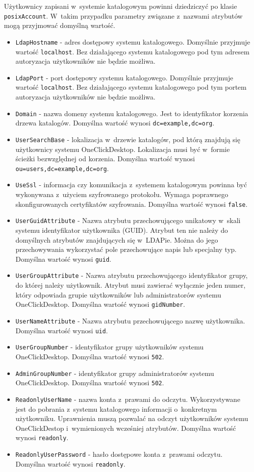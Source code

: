 \documentclass[../opis-rozwiazania.tex]{subfiles}
\begin{document}
Użytkownicy zapisani w~systemie katalogowym powinni dziedziczyć po klasie \texttt{posixAccount}. W~takim przypadku parametry związane z~nazwami atrybutów mogą przyjmować domyślną wartość.
\begin{itemize}
  \item \texttt{LdapHostname} - adres dostępowy systemu katalogowego. Domyślnie przyjmuje wartość \texttt{localhost}. Bez działającego systemu katalogowego pod tym adresem autoryzacja użytkowników nie będzie możliwa.
  \item \texttt{LdapPort} - port dostępowy systemu katalogowego. Domyślnie przyjmuje wartość \texttt{localhost}. Bez działającego systemu katalogowego pod tym portem autoryzacja użytkowników nie będzie możliwa.
  \item \texttt{Domain} - nazwa domeny systemu katalogowego. Jest to identyfikator korzenia drzewa katalogów. Domyślna wartość wynosi \texttt{dc=example,dc=org}.
  \item \texttt{UserSearchBase} - lokalizacja w~drzewie katalogów, pod którą znajdują się użytkownicy systemu OneClickDesktop. Lokalizacja musi być w~formie ścieżki bezwzględnej od korzenia. Domyślna wartość wynosi \texttt{ou=users,dc=example,dc=org}.
  \item \texttt{UseSsl} - informacja czy komunikacja z~systemem katalogowym powinna być wykonywana z~użyciem szyfrowanego protokołu. Wymaga poprawnego skonfigurowanych certyfikatów szyfrowania. Domyślna wartość wynosi \texttt{false}.
  \item \texttt{UserGuidAttribute} - Nazwa atrybutu przechowującego unikatowy w~skali systemu identyfikator użytkownika (GUID). Atrybut ten nie należy do domyślnych atrybutów znajdujących się w~LDAPie. Można do jego przechowywania wykorzystać pole przechowujące napis lub specjalny typ. Domyślna wartość wynosi \texttt{guid}.
  \item \texttt{UserGroupAttribute} - Nazwa atrybutu przechowującego identyfikator grupy, do której należy użytkownik. Atrybut musi zawierać wyłącznie jeden numer, który odpowiada grupie użytkowników lub administratorów systemu OneClickDesktop. Domyślna wartość wynosi \texttt{gidNumber}.
  \item \texttt{UserNameAttribute} - Nazwa atrybutu przechowującego nazwę użytkownika. Domyślna wartość wynosi \texttt{uid}.
  \item \texttt{UserGroupNumber} - identyfikator grupy użytkowników systemu OneClickDesktop. Domyślna wartość wynosi \texttt{502}.
  \item \texttt{AdminGroupNumber} - identyfikator grupy administratorów systemu OneClickDesktop. Domyślna wartość wynosi \texttt{502}.
  \item \texttt{ReadonlyUserName} - nazwa konta z~prawami do odczytu. Wykorzystywane jest do pobrania z~systemu katalogowego informacji o~konkretnym użytkowniku. Uprawnienia muszą pozwalać na odczyt użytkowników systemu OneClickDestop i~wymienionych wcześniej atrybutów. Domyślna wartość wynosi \texttt{readonly}.
  \item \texttt{ReadonlyUserPassword} - hasło dostępowe konta z~prawami odczytu. Domyślna wartość wynosi \texttt{readonly}.
\end{itemize}
\end{document}
